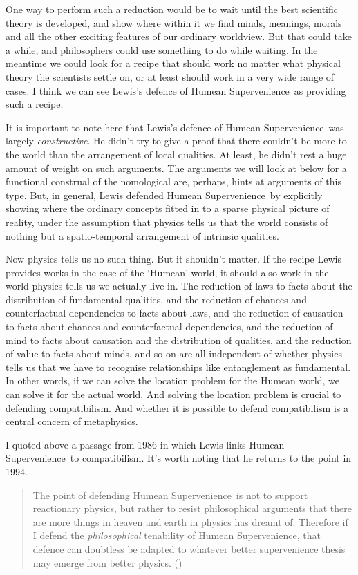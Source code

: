 \documentclass[
  10pt,
  letterpaper,
  DIV=11,
  numbers=noendperiod,
  twoside]{scrartcl}
\begin{document}
One way to perform such a reduction would be to wait until the best
scientific theory is developed, and show where within it we find minds,
meanings, morals and all the other exciting features of our ordinary
worldview. But that could take a while, and philosophers could use
something to do while waiting. In the meantime we could look for a
recipe that should work no matter what physical theory the scientists
settle on, or at least should work in a very wide range of cases. I
think we can see Lewis's defence of Humean Supervenience~as providing
such a recipe.

It is important to note here that Lewis's defence of Humean
Supervenience~was largely \emph{constructive}. He didn't try to give a
proof that there couldn't be more to the world than the arrangement of
local qualities. At least, he didn't rest a huge amount of weight on
such arguments. The arguments we will look at below for a functional
construal of the nomological are, perhaps, hints at arguments of this
type. But, in general, Lewis defended Humean Supervenience~by explicitly
showing where the ordinary concepts fitted in to a sparse physical
picture of reality, under the assumption that physics tells us that the
world consists of nothing but a spatio-temporal arrangement of intrinsic
qualities.

Now physics tells us no such thing. But it shouldn't matter. If the
recipe Lewis provides works in the case of the `Humean' world, it should
also work in the world physics tells us we actually live in. The
reduction of laws to facts about the distribution of fundamental
qualities, and the reduction of chances and counterfactual dependencies
to facts about laws, and the reduction of causation to facts about
chances and counterfactual dependencies, and the reduction of mind to
facts about causation and the distribution of qualities, and the
reduction of value to facts about minds, and so on are all independent
of whether physics tells us that we have to recognise relationships like
entanglement as fundamental. In other words, if we can solve the
location problem for the Humean world, we can solve it for the actual
world. And solving the location problem is crucial to defending
compatibilism. And whether it is possible to defend compatibilism is a
central concern of metaphysics.

I quoted above a passage from 1986 in which Lewis links Humean
Supervenience~to compatibilism. It's worth noting that he returns to the
point in 1994.

\begin{quote}
The point of defending Humean Supervenience~is not to support
reactionary physics, but rather to resist philosophical arguments that
there are more things in heaven and earth in physics has dreamt of.
Therefore if I defend the \emph{philosophical} tenability of Humean
Supervenience, that defence can doubtless be adapted to whatever better
supervenience thesis may emerge from better physics.
()
\end{quote}
\end{document}
